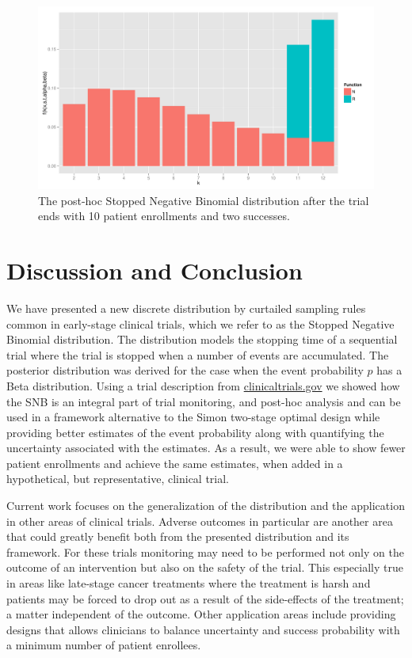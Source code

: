\documentclass[12pt]{article}         %
\begin{document}
\begin{figure}[ht]
\includegraphics[width=\textwidth]{post_hoc.pdf}
\caption{
The post-hoc Stopped Negative Binomial distribution after the trial ends with 10 patient enrollments and two successes.
}
\label{fig:post_hoc}
\end{figure}

\section{Discussion and Conclusion}

We have presented a new discrete distribution by curtailed sampling rules common in early-stage clinical trials, which we refer to as the Stopped Negative Binomial distribution. The distribution models the stopping time of a sequential trial where the trial is stopped when a number of events are accumulated. The 
posterior distribution was derived for the case when the event probability $p$ 
has a Beta distribution. Using a trial description from 
\url{clinicaltrials.gov} we showed how the SNB is an integral part of trial 
monitoring, and post-hoc analysis and can be used in a framework alternative 
to the Simon two-stage optimal design while providing better estimates of the 
event probability along with quantifying the uncertainty associated with the 
estimates. As a result, we were able to show fewer patient enrollments and 
achieve the same estimates, when added in a hypothetical, but representative, 
clinical trial.

Current work focuses on the generalization of the distribution and the application in other areas of clinical trials. Adverse outcomes in particular are another area that could greatly benefit both from the presented distribution and its framework. For these trials monitoring may need to be performed not only on the outcome of an intervention but also on the safety of the trial. This especially 
true in areas like late-stage cancer treatments where the treatment is harsh 
and patients may be forced to drop out as a result of the side-effects of the 
treatment; a matter independent of the outcome. Other application areas 
include providing designs that allows clinicians to balance uncertainty and 
success probability with a minimum number of patient enrollees.
\end{document}
